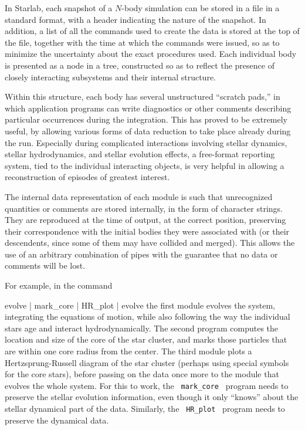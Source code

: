 In Starlab, each snapshot of a $N$-body simulation can be stored in a
file in a standard format, with a header indicating the nature of the
snapshot.  In addition, a list of all the commands used to create the
data is stored at the top of the file, together with the time at which
the commands were issued, so as to minimize the uncertainty about the
exact procedures used.  Each individual body is presented as a node in
a tree, constructed so as to reflect the presence of closely
interacting subsystems and their internal structure.

Within this structure, each body has several unstructured ``scratch
pads,'' in which application programs can write diagnostics or other
comments describing particular occurrences during the integration.
This has proved to be extremely useful, by allowing various forms of
data reduction to take place already during the run.  Especially
during complicated interactions involving stellar dynamics, stellar
hydrodynamics, and stellar evolution effects, a free-format reporting
system, tied to the individual interacting objects, is very helpful in
allowing a reconstruction of episodes of greatest interest.

The internal data representation of each module is such that
unrecognized quantities or comments are stored internally, in the form
of character strings.  They are reproduced at the time of output, at
the correct position, preserving their correspondence with the initial
bodies they were associated with (or their descendents, since some of
them may have collided and merged).  This allows the use of an
arbitrary combination of pipes with the guarantee that no data or
comments will be lost.

For example, in the command

{\codes
\quad evolve | mark\_core | HR\_plot | evolve
}
\medskip\noindent
the first module evolves the system, integrating the equations of
motion, while also following the way the individual stars age and
interact hydrodynamically.  The second program computes the location
and size of the core of the star cluster, and marks those particles
that are within one core radius from the center.  The third module
plots a Hertzsprung-Russell diagram of the star cluster (perhaps using
special symbols for the core stars), before passing on the data once
more to the module that evolves the whole system.  For this to work,
the {\tt \ mark\_core\ } program needs to preserve the stellar
evolution information, even though it only ``knows'' about the stellar
dynamical part of the data.  Similarly, the {\tt \ HR\_plot\ } program
needs to preserve the dynamical data.

